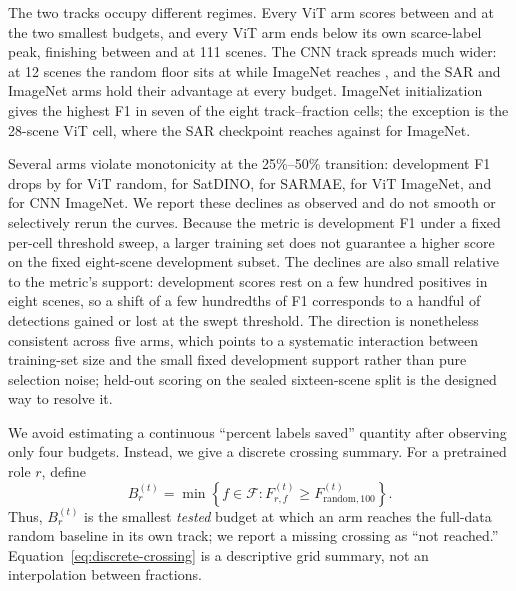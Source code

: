 The two tracks occupy different regimes. Every ViT arm scores between
\DevFVitRandomTwentyFive{} and \DevFVitSarTwentyFive{} at the two smallest
budgets, and every ViT arm ends below its own scarce-label peak, finishing
between \DevFVitRandomHundred{} and \DevFVitImageNetHundred{} at 111 scenes. The CNN
track spreads much wider: at 12 scenes the random floor sits at
\DevFCnnRandomTen{} while ImageNet reaches \DevFCnnImageNetTen, and the SAR
and ImageNet arms hold their advantage at every budget. ImageNet
initialization gives the highest F1 in seven of the eight track--fraction
cells; the exception is the 28-scene ViT cell, where the SAR checkpoint
reaches \DevFVitSarTwentyFive{} against \DevFVitImageNetTwentyFive{} for
ImageNet.

Several arms violate monotonicity at the 25\%--50\% transition: development
F1 drops by \MonoDropVitRandom{} for ViT random, \MonoDropVitOptical{} for
SatDINO, \MonoDropVitSar{} for SARMAE, \MonoDropVitImageNet{} for ViT
ImageNet, and \MonoDropCnnImageNet{} for CNN ImageNet. We report these
declines as observed and do not smooth or selectively rerun the curves.
Because the metric is development F1 under a fixed per-cell threshold sweep,
a larger training set does not guarantee a higher score on the fixed
eight-scene development subset. The declines are also small relative to the
metric's support: development scores rest on a few hundred positives in
eight scenes, so a shift of a few hundredths of F1 corresponds to a handful
of detections gained or lost at the swept threshold. The direction is
nonetheless consistent across five arms, which points to a systematic
interaction between training-set size and the small fixed development
support rather than pure selection noise; held-out scoring on the sealed
sixteen-scene split is the designed way to resolve it.

We avoid estimating a continuous ``percent labels saved'' quantity after
observing only four budgets. Instead, we give a discrete crossing summary.
For a pretrained role $r$, define
\begin{equation}
  B_{r}^{(t)} =
  \min\left\{f\in\mathcal{F}:F_{r,f}^{(t)}
  \geq F_{\mathrm{random},100}^{(t)}\right\}.
  \label{eq:discrete-crossing}
\end{equation}
Thus, $B_{r}^{(t)}$ is the smallest \emph{tested} budget at which an arm
reaches the full-data random baseline in its own track; we report a missing
crossing as ``not reached.''  Equation~\eqref{eq:discrete-crossing} is a
descriptive grid summary, not an interpolation between fractions.


